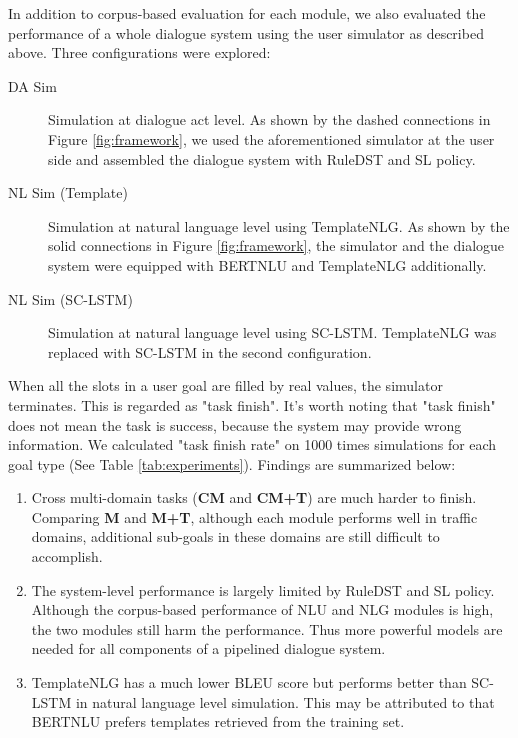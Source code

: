 In addition to corpus-based evaluation for each module, we also evaluated the performance of a whole dialogue system using the user simulator as described above. Three configurations were explored:
\begin{description}
    \item[DA Sim] Simulation at dialogue act level. As shown by the dashed connections in Figure \ref{fig:framework}, we used the aforementioned simulator at the user side and assembled the dialogue system with RuleDST and SL policy.
    
    \item[NL Sim (Template)] Simulation at natural language level using TemplateNLG. As shown by the solid connections in Figure \ref{fig:framework}, the simulator and the dialogue system were equipped with BERTNLU and TemplateNLG additionally.
    
    \item[NL Sim (SC-LSTM)] Simulation at natural language level using SC-LSTM. TemplateNLG was replaced with SC-LSTM in the second configuration.
\end{description}

When all the slots in a user goal are filled by real values, the simulator terminates. This is regarded as "task finish". It's worth noting that "task finish" does not mean the task is success, because the system may provide wrong information. We calculated "task finish rate" on 1000 times simulations for each goal type (See Table \ref{tab:experiments}). 
Findings are summarized below:

\begin{enumerate}
    \item Cross multi-domain tasks (\textbf{CM} and \textbf{CM+T}) are much harder to finish. 
    Comparing \textbf{M} and \textbf{M+T}, although each module performs well in traffic domains, additional sub-goals in these domains are still difficult to accomplish. 
    
    
    \item The system-level performance is largely limited by RuleDST and SL policy.
    Although the corpus-based performance of NLU and NLG modules is high, the two modules
    still harm the performance. Thus more powerful models are needed for all components of a pipelined dialogue system.
    
    \item TemplateNLG has a much lower BLEU score but performs better than SC-LSTM in natural language level simulation. This may be attributed to that BERTNLU prefers templates retrieved from the training set.
    
    
\end{enumerate}

